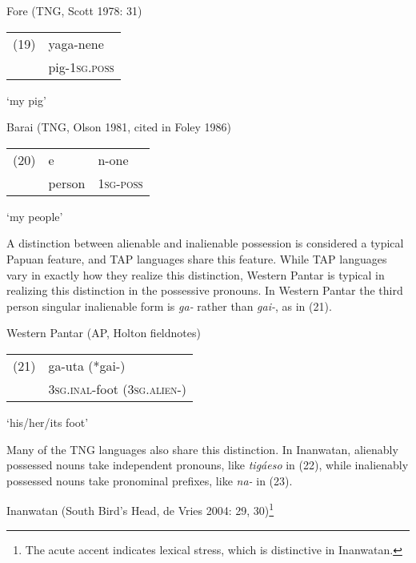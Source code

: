 Fore (TNG, Scott 1978: 31)

\begin{flushleft}
\tablehead{}
\begin{supertabular}{m{0.32545984in}m{0.8906598in}}
(19) &
yaga-nene\\
 &
pig-\textsc{1sg.poss}\\
\end{supertabular}
\end{flushleft}
{\textquoteleft}my pig{\textquoteright}  

Barai (TNG, Olson 1981, cited in Foley 1986)

\begin{flushleft}
\tablehead{}
\begin{supertabular}{m{0.32545984in}m{0.47885987in}m{0.65805984in}}
(20) &
e &
n-one\\
 &
person &
\textsc{1sg-poss}\\
\end{supertabular}
\end{flushleft}
{\textquoteleft}my people{\textquoteright} 

A distinction between alienable and inalienable possession is considered a typical Papuan feature, and TAP languages share this feature. While TAP languages vary in exactly how they realize this distinction, Western Pantar is typical in realizing this distinction in the possessive pronouns. In Western Pantar the third person singular inalienable form is \textit{ga-} rather than \textit{gai-}, as in (21).

Western Pantar (AP, Holton fieldnotes)

\begin{flushleft}
\tablehead{}
\begin{supertabular}{m{0.32545984in}m{1.8962599in}}
(21) &
ga-uta  (*gai-)\\
 &
\textsc{3sg.inal}{}-foot  (3\textsc{sg.alien-)}\\
\end{supertabular}
\end{flushleft}
{\textquoteleft}his/her/its foot{\textquoteright}

Many of the TNG languages also share this distinction. In Inanwatan, alienably possessed nouns take independent pronouns, like \textit{tig\'aeso} in (22), while inalienably possessed nouns take pronominal prefixes, like \textit{na- }in (23). 

Inanwatan (South Bird{\textquoteright}s Head, de Vries 2004: 29, 30)\footnote{ The acute accent indicates lexical stress, which is distinctive in Inanwatan.}

